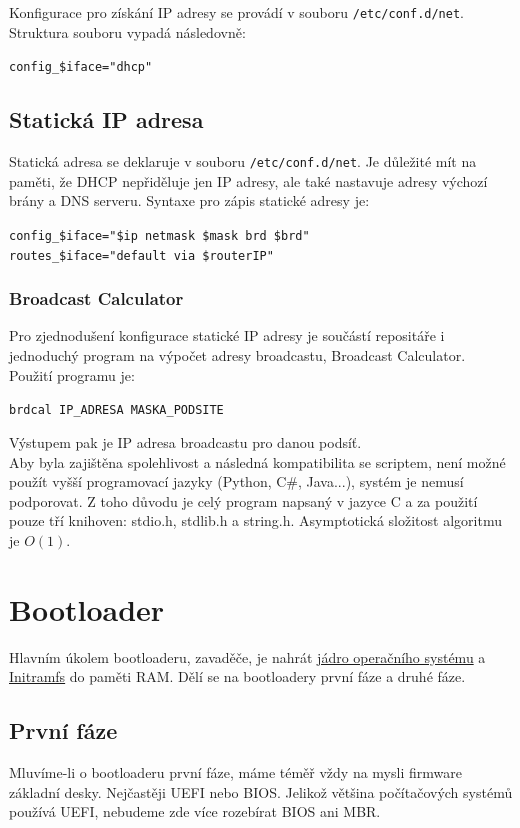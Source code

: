 \documentclass[12pt,a4paper,twoside,]{article}
\begin{document}
{{{{{{\hspace*{-1.5em}Konfigurace pro získání IP adresy se provádí v souboru \texttt{/etc/conf.d/net}. \\Struktura souboru vypadá následovně:

\texttt{config\_\$iface="dhcp"}

\subsection{\textsf{Statická IP adresa}}
Statická adresa se deklaruje v souboru \texttt{/etc/conf.d/net}. Je důležité mít na paměti, že DHCP nepřiděluje jen IP adresy, ale také nastavuje adresy výchozí brány a DNS serveru. Syntaxe pro zápis statické adresy je:

\texttt{config\_\$iface="\$ip netmask \$mask brd \$brd"}\\
\hspace*{1.5em}\texttt{routes\_\$iface="default via \$routerIP"}
\subsubsection{\textsf{Broadcast Calculator}}
Pro zjednodušení konfigurace statické IP adresy je součástí repositáře i jednoduchý program na výpočet adresy broadcastu, Broadcast Calculator. Použití programu je:

\texttt{brdcal IP\_ADRESA MASKA\_PODSITE}


\hspace*{-1.5em}Výstupem pak je IP adresa broadcastu pro danou podsíť. \\


Aby byla zajištěna spolehlivost a následná kompatibilita se scriptem, není možné použít vyšší programovací jazyky (Python, C\#, Java...), systém je nemusí podporovat. Z toho důvodu je celý program napsaný v jazyce C a za použití pouze tří knihoven: stdio.h, stdlib.h a string.h. Asymptotická složitost algoritmu je $O(1)$.

\newpage
\section{\textsf{Bootloader}}

Hlavním úkolem bootloaderu, zavaděče, je nahrát \hyperlink{Kernel}{jádro operačního systému} a \hyperlink{Initramfs}{Initramfs} do paměti RAM. Dělí se na bootloadery první fáze a druhé fáze.
\subsection{\textsf{První fáze}}
Mluvíme-li o bootloaderu první fáze, máme téměř vždy na mysli firmware základní desky. Nejčastěji UEFI nebo BIOS. Jelikož většina počítačových systémů používá UEFI, nebudeme zde více rozebírat BIOS ani MBR.

}}}}}}
\end{document}
